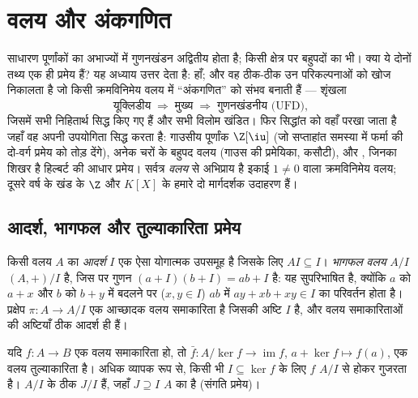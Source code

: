 \chapter{वलय और अंकगणित}\label{ch:b3:rings}

साधारण पूर्णांकों का अभाज्यों में गुणनखंडन अद्वितीय होता है; किसी
क्षेत्र पर बहुपदों का भी। क्या ये दोनों तथ्य एक ही प्रमेय हैं? यह
अध्याय उत्तर देता है: हाँ; और वह ठीक-ठीक उन परिकल्पनाओं को खोज
निकालता है जो किसी क्रमविनिमेय वलय में ``अंकगणित'' को संभव बनाती
हैं --- शृंखला
\[
\text{यूक्लिडीय} \;\Longrightarrow\; \text{मुख्य}
\;\Longrightarrow\; \text{गुणनखंडनीय (UFD)},
\]
जिसमें सभी निहितार्थ सिद्ध किए गए हैं और सभी विलोम खंडित। फिर
सिद्धांत को वहाँ परखा जाता है जहाँ वह अपनी उपयोगिता सिद्ध करता है:
गाउसीय पूर्णांक $\Z[\iu]$ (जो सप्ताहांत समस्या में फर्मा की दो-वर्ग
प्रमेय को तोड़ देंगे), अनेक चरों के बहुपद वलय (गाउस की प्रमेयिका,
 कसौटी), और , जिनका शिखर है हिल्बर्ट की
आधार प्रमेय। सर्वत्र \emph{वलय} से अभिप्राय है इकाई $1 \neq 0$ वाला
क्रमविनिमेय वलय; दूसरे वर्ष के खंड के $\Z$ और $K[X]$ के  हमारे
दो मार्गदर्शक उदाहरण हैं।

\section{आदर्श, भागफल और तुल्याकारिता प्रमेय}

\begin{definition}\label{def:b3:rings:ideal}
किसी वलय $A$ का \emph{आदर्श} $I$ एक ऐसा योगात्मक
उपसमूह है जिसके लिए $AI \subseteq I$। \emph{भागफल वलय}
$A/I$  $(A, +)/I$ है, जिस पर गुणन $(a + I)(b + I) = ab + I$ है: यह सुपरिभाषित है,
क्योंकि $a$ को $a + x$ और $b$ को $b + y$ में बदलने पर ($x, y \in I$) $ab$
में $ay + xb + xy \in I$ का परिवर्तन होता है। प्रक्षेप $\pi \colon A
\to A/I$ एक आच्छादक वलय
समाकारिता है जिसकी अष्टि $I$ है, और वलय समाकारिताओं की अष्टियाँ
ठीक आदर्श ही हैं।
\end{definition}

\begin{theorem}[प्रथम तुल्याकारिता प्रमेय]\label{thm:b3:rings:firstiso}
यदि $f \colon A \to B$ एक वलय समाकारिता हो, तो $\bar f\colon
A/\ker f \to \operatorname{im} f$, $a + \ker f \mapsto f(a)$, एक वलय
तुल्याकारिता है। अधिक व्यापक रूप से, किसी भी  $I \subseteq \ker f$ के लिए
$f$ $A/I$ से होकर गुजरता है। $A/I$ के  ठीक $J/I$ हैं, जहाँ
$J \supseteq I$ $A$ का  है (संगति प्रमेय)।
\end{theorem}

